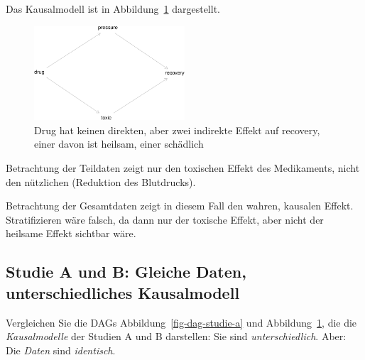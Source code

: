 \documentclass[
  a4paper,
  DIV=11]{scrreprt}
\theoremstyle{definition}
\theoremstyle{remark}
\begin{document}
Das Kausalmodell ist in Abbildung~\ref{fig-dag-studie-b} dargestellt.

\begin{figure}

{\centering \includegraphics[width=0.5\textwidth,height=\textheight]{./kausal_files/figure-pdf/fig-dag-studie-b-1.pdf}

}

\caption{\label{fig-dag-studie-b}Drug hat keinen direkten, aber zwei
indirekte Effekt auf recovery, einer davon ist heilsam, einer schädlich}

\end{figure}

Betrachtung der Teildaten zeigt nur den toxischen Effekt des
Medikaments, nicht den nützlichen (Reduktion des Blutdrucks).

\begin{tcolorbox}[enhanced jigsaw, leftrule=.75mm, left=2mm, bottomrule=.15mm, opacityback=0, coltitle=black, colbacktitle=quarto-callout-important-color!10!white, opacitybacktitle=0.6, rightrule=.15mm, toptitle=1mm, colback=white, colframe=quarto-callout-important-color-frame, arc=.35mm, toprule=.15mm, breakable, titlerule=0mm, bottomtitle=1mm, title=\textcolor{quarto-callout-important-color}{\faExclamation}\hspace{0.5em}{Wichtig}]
Betrachtung der Gesamtdaten zeigt in diesem Fall den wahren, kausalen
Effekt. Stratifizieren wäre falsch, da dann nur der toxische Effekt,
aber nicht der heilsame Effekt sichtbar wäre.
\end{tcolorbox}

\hypertarget{studie-a-und-b-gleiche-daten-unterschiedliches-kausalmodell}{%
\subsection{Studie A und B: Gleiche Daten, unterschiedliches
Kausalmodell}\label{studie-a-und-b-gleiche-daten-unterschiedliches-kausalmodell}}

Vergleichen Sie die DAGs Abbildung~\ref{fig-dag-studie-a} und
Abbildung~\ref{fig-dag-studie-b}, die die \emph{Kausalmodelle} der
Studien A und B darstellen: Sie sind \emph{unterschiedlich}. Aber: Die
\emph{Daten} sind \emph{identisch}.
\end{document}
